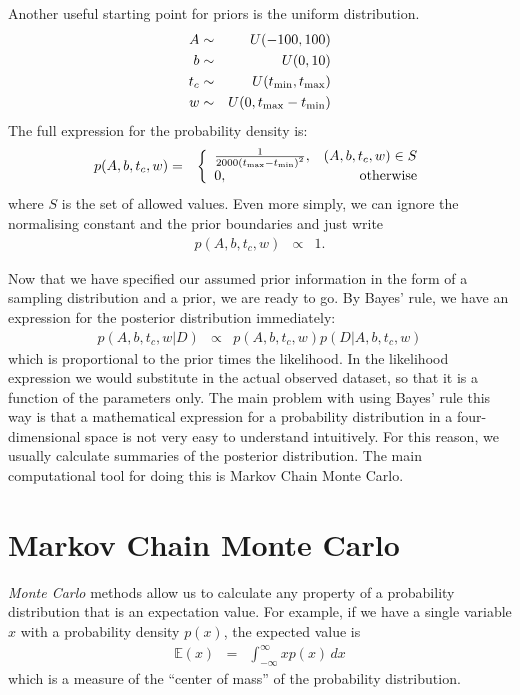Another useful starting point for priors is the uniform distribution.
\begin{eqnarray}
A &\sim& U(-100, 100)\\
b &\sim& U(0, 10)\\
t_c &\sim& U(t_{\rm min}, t_{\rm max})\\
w &\sim& U(0, t_{\rm max} - t_{\rm min})
\end{eqnarray}
The full expression for the probability density is:
\begin{eqnarray}
p(A, b, t_c, w) &=&
\left\{
\begin{array}{lr}
\frac{1}{2000\left(t_{\rm max} - t_{\rm min}\right)^2}, & (A, b, t_c, w) \in S\\
0, & \textnormal{otherwise}
\end{array}
\right.
\end{eqnarray}
where $S$ is the set of allowed values. Even more simply, we can ignore the
normalising constant and the prior boundaries and just write
\begin{eqnarray}
p(A, b, t_c, w) &\propto& 1.
\end{eqnarray}

Now that we have specified our assumed prior information in the form of a
sampling distribution and a prior, we are ready to go. By Bayes' rule, we
have an expression for the posterior distribution immediately:
\begin{eqnarray}
p(A, b, t_c, w | D) &\propto& p(A, b, t_c, w)p(D | A, b, t_c, w)
\end{eqnarray}
which is proportional to the prior times the likelihood. In the likelihood
expression we would substitute in the actual observed dataset, so that it is
a function of the parameters only.
The main problem with using Bayes' rule this way is that a mathematical
expression for a probability distribution in a four-dimensional space is not
very easy to understand intuitively. For this reason, we usually calculate
summaries of the posterior distribution. The main computational tool for doing
this is Markov Chain Monte Carlo.

\section{Markov Chain Monte Carlo}
{\it Monte Carlo} methods allow us to calculate any property of a probability
distribution that is an expectation value. For example, if we have a
single variable
$x$ with a probability density $p(x)$, the expected value is
\begin{eqnarray}
\mathds{E}(x) &=& \int_{-\infty}^{\infty} x p(x) \, dx 
\end{eqnarray}
which is a measure of the ``center of mass'' of the probability distribution.

